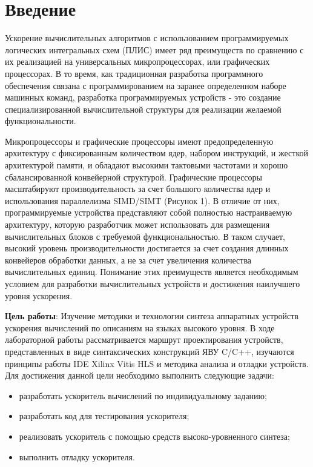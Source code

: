 \documentclass[12pt]{report}
\begin{document}
\setcounter{page}{2}
\tableofcontents

\newpage
\chapter*{Введение}
Ускорение вычислительных алгоритмов с использованием программируемых логических интегральных схем (ПЛИС) имеет ряд преимуществ по сравнению с их реализацией на универсальных микропроцессорах, или графических процессорах. В то время, как традиционная разработка программного обеспечения связана с программированием на заранее определенном наборе машинных команд, разработка программируемых устройств - это создание специализированной вычислительной структуры для реализации желаемой функциональности.

Микропроцессоры и графические процессоры имеют предопределенную архитектуру с фиксированным количеством ядер, набором инструкций, и жесткой архитектурой памяти, и обладают высокими тактовыми частотами и хорошо сбалансированной конвейерной структурой. Графические процессоры масштабируют производительность за счет большого количества ядер и использования параллелизма SIMD/SIMT (Рисунок 1). В отличие от них, программируемые устройства представляют собой полностью настраиваемую архитектуру, которую разработчик может использовать для размещения вычислительных блоков с требуемой функциональностью. В таком случает, высокий уровень производительности достигается за счет создания длинных конвейеров обработки данных, а не за счет увеличения количества вычислительных единиц. Понимание этих преимуществ является необходимым условием для разработки вычислительных устройств и достижения наилучшего уровня ускорения.

\textbf{Цель работы}: Изучение методики и технологии синтеза аппаратных устройств ускорения вычислений по описаниям на языках высокого уровня. В ходе лабораторной работы рассматривается маршрут проектирования устройств, представленных в виде синтаксических конструкций ЯВУ C/C++, изучаются принципы работы IDE Xilinx Vitis HLS и методика анализа и отладки устройств. Для достижения данной цели необходимо выполнить следующие задачи:
\begin{itemize}
\item разработать ускоритель вычислений по индивидуальному заданию;
\item разработать код для тестирования ускорителя;
\item реализовать ускоритель с помощью средств высоко-уровненного синтеза;
\item выполнить отладку ускорителя.
\end{itemize}
\end{document}
